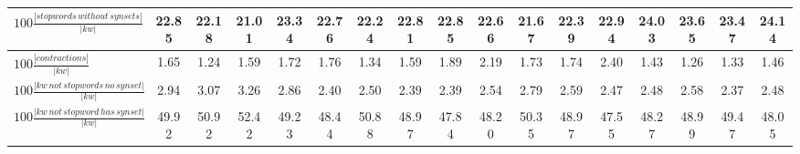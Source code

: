 \documentclass[%
 aip,
 jmp,%
 amsmath,amssymb,
 reprint,%
]{revtex4-1}
\begin{document}
\begin{table}
\begin{tabular}{|l|| c|c|c|c||  c|c|c|c||   c|c|c|c||   c|c|c|c|}
$100\frac{|stopwords\,without\,synsets|}{|kw|}$ & 22.85 & 22.18 & 21.01 & 23.34 & 22.76 & 22.24 & 22.81 & 22.85 & 22.66 & 21.67 & 22.39 & 22.94 & 24.03 & 23.65 & 23.47 & 24.14 \\\hline
$100\frac{|contractions|}{|kw|}$ & 1.65 & 1.24 & 1.59 & 1.72 & 1.76 & 1.34 & 1.59 & 1.89 & 2.19 & 1.73 & 1.74 & 2.40 & 1.43 & 1.26 & 1.33 & 1.46 \\\hline
$100\frac{|kw\,not\,stopwords\,no\,synset|}{|kw|}$ & 2.94 & 3.07 & 3.26 & 2.86 & 2.40 & 2.50 & 2.39 & 2.39 & 2.54 & 2.79 & 2.59 & 2.47 & 2.48 & 2.58 & 2.37 & 2.48 \\\hline
$100\frac{|kw\,not\,stopword\,has\,synset|}{|kw|}$ & 49.92 & 50.92 & 52.42 & 49.23 & 48.44 & 50.88 & 48.97 & 47.84 & 48.20 & 50.35 & 48.97 & 47.55 & 48.27 & 48.99 & 49.47 & 48.05 \\\hline

\end{tabular}
\end{table}
\end{document}
